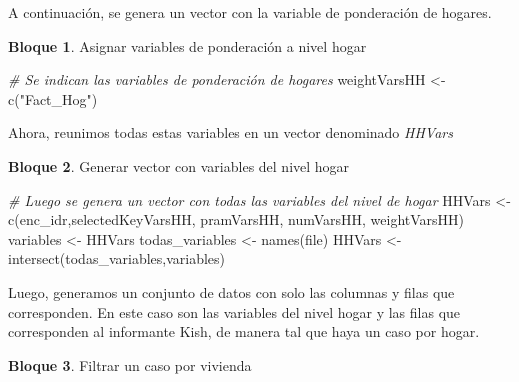 \documentclass[
]{book}
\newenvironment{Shaded}{\begin{snugshade}}{\end{snugshade}}
\newcommand{\CommentTok}[1]{\textcolor[rgb]{0.56,0.35,0.01}{\textit{#1}}}
\newcommand{\FunctionTok}[1]{\textcolor[rgb]{0.00,0.00,0.00}{#1}}
\newcommand{\NormalTok}[1]{#1}
\newcommand{\OtherTok}[1]{\textcolor[rgb]{0.56,0.35,0.01}{#1}}
\newcommand{\StringTok}[1]{\textcolor[rgb]{0.31,0.60,0.02}{#1}}
\theoremstyle{definition}
\theoremstyle{definition}
\newtheorem{example}{Bloque}[chapter]
\theoremstyle{definition}
\theoremstyle{definition}
\theoremstyle{remark}
\begin{document}
A continuación, se genera un vector con la variable de ponderación de hogares.

\begin{example}
\protect\hypertarget{exm:bloque39nbm}{}\label{exm:bloque39nbm}Asignar variables de ponderación a nivel hogar
\end{example}

\begin{Shaded}
\begin{Highlighting}[]
\CommentTok{\# Se indican las variables de ponderación de hogares}
\NormalTok{weightVarsHH }\OtherTok{\textless{}{-}} \FunctionTok{c}\NormalTok{(}\StringTok{"Fact\_Hog"}\NormalTok{)}
\end{Highlighting}
\end{Shaded}

Ahora, reunimos todas estas variables en un vector denominado \emph{HHVars}

\begin{example}
\protect\hypertarget{exm:bloque40nbm}{}\label{exm:bloque40nbm}Generar vector con variables del nivel hogar
\end{example}

\begin{Shaded}
\begin{Highlighting}[]
\CommentTok{\# Luego se genera un vector con todas las variables del nivel de hogar}
\NormalTok{HHVars }\OtherTok{\textless{}{-}} \FunctionTok{c}\NormalTok{(}\StringTok{\textquotesingle{}enc\_idr\textquotesingle{}}\NormalTok{,selectedKeyVarsHH, pramVarsHH, numVarsHH, weightVarsHH)}
\NormalTok{variables }\OtherTok{\textless{}{-}}\NormalTok{ HHVars}
\NormalTok{todas\_variables }\OtherTok{\textless{}{-}} \FunctionTok{names}\NormalTok{(file)}
\NormalTok{HHVars }\OtherTok{\textless{}{-}} \FunctionTok{intersect}\NormalTok{(todas\_variables,variables)}
\end{Highlighting}
\end{Shaded}

Luego, generamos un conjunto de datos con solo las columnas y filas que corresponden. En este caso son las variables del nivel hogar y las filas que corresponden al informante Kish, de manera tal que haya un caso por hogar.

\begin{example}
\protect\hypertarget{exm:bloque41nbm}{}\label{exm:bloque41nbm}Filtrar un caso por vivienda
\end{example}
\end{document}
